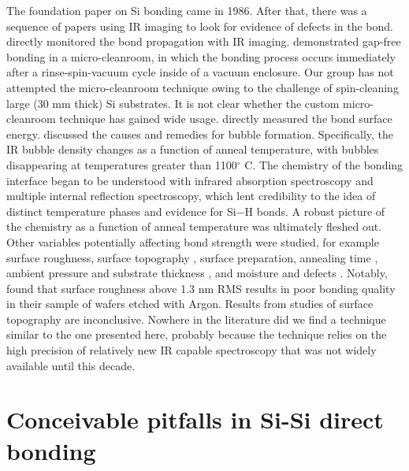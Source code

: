 \documentclass[osajnl,preprint,showpacs,superscriptaddress,12pt]{revtex4-1} %
\begin{document}
The foundation paper on Si bonding came in 1986\cite{1986JAP....60.2987S}.  After that, there was a sequence of papers using IR imaging to look for evidence of defects in the bond.  \cite{1988JaJAP..27L2364S, 1995ApPhL..67.3614G} directly monitored the bond propagation with IR imaging.  \cite{1988JaJAP..27L2364S, 1989JaJAP..28L2141L} demonstrated gap-free bonding in a micro-cleanroom, in which the bonding process occurs immediately after a rinse-spin-vacuum cycle inside of a vacuum enclosure.  Our group has not attempted the micro-cleanroom technique owing to the challenge of spin-cleaning large (30 mm thick) Si substrates.  It is not clear whether the custom micro-cleanroom technique has gained wide usage.  \cite{1989JaJAP..28L2141L} directly measured the bond surface energy.  \cite{Mitani1990} discussed the causes and remedies for bubble formation.  Specifically, the IR bubble density changes as a function of anneal temperature\cite{1992JEMat..21..669M}, with bubbles disappearing at temperatures greater than 1100$^\circ$ C.  The chemistry of the bonding interface began to be understood with infrared absorption spectroscopy and multiple internal reflection spectroscopy\cite{feijoo1994}, which lent credibility to the idea of distinct temperature phases and evidence for Si$-$H bonds\cite{1995ApPhA..61..101R}.  A robust picture of the chemistry as a function of anneal temperature was ultimately fleshed out\cite{1996JaJAP..35.2102R, 1998AnRMS..28..215G}.  Other variables potentially affecting bond strength were studied, for example surface roughness\cite{JJAP.37.4197}, surface topography \cite{2001JOptA...3...85G}, surface preparation\cite{1996ApPhL..68.2222T}, annealing time \cite{2000JAP....88.4404H}, ambient pressure and substrate thickness \cite{1995ApPhL..67..863G, 2007ApOpt..46.6793H}, and moisture and defects \cite{2001JAP....89.6013L}.  Notably, \cite{JJAP.37.4197} found that surface roughness above 1.3 nm RMS results in poor bonding quality in their sample of wafers etched with Argon.  Results from studies of surface topography are inconclusive\cite{2001JOptA...3...85G}.  Nowhere in the literature did we find a technique similar to the one presented here, probably because the technique relies on the high precision of relatively new IR capable spectroscopy that was not widely available until this decade.


\section{Conceivable pitfalls in Si-Si direct bonding}
\end{document}
